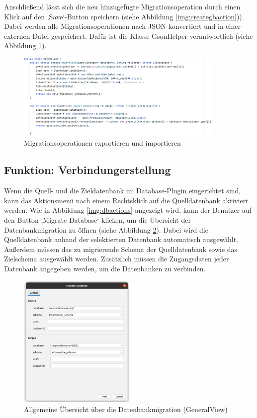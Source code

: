 	Anschließend lässt sich die neu hinzugefügte Migrationsoperation durch einen Klick auf den ,Save‘-Button speichern (siehe Abbildung \ref{img:creategbaction})). Dabei werden alle Migrationsoperationen nach JSON konvertiert und in einer externen Datei gespeichert. Dafür ist die Klasse GsonHelper verantwortlich (siehe Abbildung \ref{img:gson}).
	\begin{figure}[h]
		\centering
		\includegraphics[width=0.9\textwidth]{images/ui/gson}
		\caption{Migrationsoperationen exportieren und importieren}
		\label{img:gson}
	\end{figure}
	
\subsection{Funktion: Verbindungerstellung}
		
	Wenn die Quell- und die Zieldatenbank im Database-Plugin eingerichtet sind, kann das Aktionsmenü nach einem Rechtsklick auf die Quelldatenbank aktiviert werden. Wie in  Abbildung \ref{img:dbactions} angezeigt wird, kann der Benutzer auf den Button ,Migrate Database‘ klicken, um die Übersicht der Datenbankmigration zu öffnen (siehe Abbildung \ref{img:ui:generalView}). Dabei wird die Quelldatenbank anhand der selektierten Datenbank automatisch ausgewählt. Außerdem müssen das zu migrierende Schema der Quelldatenbank sowie das Zielschema ausgewählt werden. Zusätzlich müssen die Zugangsdaten jeder Datenbank angegeben werden, um die Datenbanken zu verbinden. 
	

	\begin{figure}[h]
		\centering
		\includegraphics[width=0.5\textwidth]{images/ui/generalView}
		\caption{Allgemeine Übersicht über die Datenbankmigration (GeneralView)}
		\label{img:ui:generalView}
	\end{figure}
	
